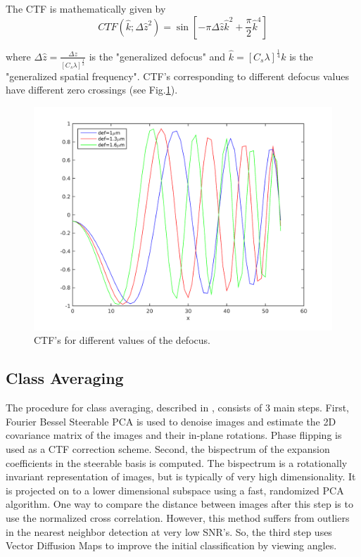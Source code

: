 \documentclass{article}
\begin{document}
The CTF is mathematically given by \cite{frankctf}
\begin{equation}
CTF(\hat{k};\Delta\hat{z}^2)= \sin[-\pi \Delta\hat{z}\hat{k}^2 + \frac{\pi}{2} \hat{k}^4]
\label{eq:ctf}
\end{equation}

where 
$\Delta\hat{z}=\frac{\Delta z}{[C_s \lambda]^{\frac{1}{2}}}$ is the "generalized defocus" and $\hat{k}=[C_s \lambda]^{\frac{1}{4}}k$ is the "generalized spatial frequency". CTF's corresponding to different defocus values have different zero crossings (see Fig.\ref{fig:ctf}).

\begin{figure}
\begin{center}
\includegraphics[scale=0.5]{ctfeg_fig.png}
\caption{CTF's for different values of the defocus.}\label{fig:ctf}
\end{center}

\end{figure}


\subsection{Class Averaging}
The procedure for class averaging, described in \cite{zhao}, consists of 3 main steps. First, Fourier Bessel Steerable PCA is used to denoise images and estimate the 2D covariance matrix of the images and their in-plane rotations. Phase flipping is used as a CTF correction scheme. Second, the bispectrum of the expansion coefficients in the steerable basis is computed. The bispectrum is a rotationally invariant representation of images, but is typically of very high dimensionality. It is projected on to a lower dimensional subspace using a fast, randomized PCA algorithm. One way to compare the distance between images after this step is to use the normalized cross correlation. However, this method suffers from outliers in the nearest neighbor detection at very low SNR's. So, the third step uses Vector Diffusion Maps to improve the initial classification by viewing angles.
\end{document}
